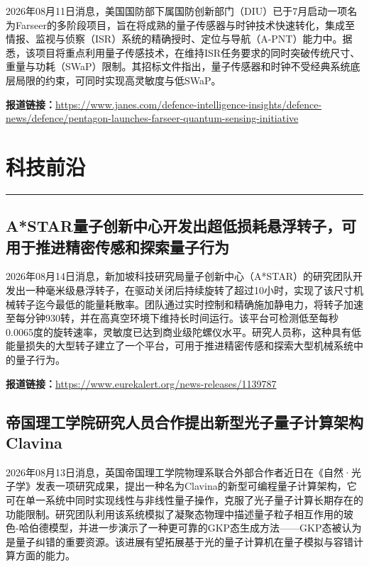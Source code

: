 \documentclass[12pt,a4paper]{ctexart}
\begin{document}
2026年08月11日消息，美国国防部下属国防创新部门（DIU）已于7月启动一项名为Farseer的多阶段项目，旨在将成熟的量子传感器与时钟技术快速转化，集成至情报、监视与侦察（ISR）系统的精确授时、定位与导航（A-PNT）能力中。据悉，该项目将重点利用量子传感技术，在维持ISR任务要求的同时突破传统尺寸、重量与功耗（SWaP）限制。其招标文件指出，量子传感器和时钟不受经典系统底层局限的约束，可同时实现高灵敏度与低SWaP。

\noindent\textbf{报道链接：}\url{https://www.janes.com/defence-intelligence-insights/defence-news/defence/pentagon-launches-farseer-quantum-sensing-initiative}


\newpage
\section{科技前沿}
\vspace{-0.5em}
\noindent\rule{\linewidth}{1.5pt}

\subsection{ A*STAR量子创新中心开发出超低损耗悬浮转子，可用于推进精密传感和探索量子行为 }

2026年08月14日消息，新加坡科技研究局量子创新中心（A*STAR）的研究团队开发出一种毫米级悬浮转子，在驱动关闭后持续旋转了超过10小时，实现了该尺寸机械转子迄今最低的能量耗散率。团队通过实时控制和精确施加静电力，将转子加速至每分钟930转，并在高真空环境下维持长时间运行。该平台可检测低至每秒0.0065度的旋转速率，灵敏度已达到商业级陀螺仪水平。研究人员称，这种具有低能量损失的大型转子建立了一个平台，可用于推进精密传感和探索大型机械系统中的量子行为。

\noindent\textbf{报道链接：}\url{https://www.eurekalert.org/news-releases/1139787}

\subsection{ 帝国理工学院研究人员合作提出新型光子量子计算架构Clavina }

2026年08月13日消息，英国帝国理工学院物理系联合外部合作者近日在《自然·光子学》发表一项研究成果，提出一种名为Clavina的新型可编程量子计算架构，它可在单一系统中同时实现线性与非线性量子操作，克服了光子量子计算长期存在的功能限制。研究团队利用该系统模拟了凝聚态物理中描述量子粒子相互作用的玻色-哈伯德模型，并进一步演示了一种更可靠的GKP态生成方法——GKP态被认为是量子纠错的重要资源。该进展有望拓展基于光的量子计算机在量子模拟与容错计算方面的能力。
\end{document}
